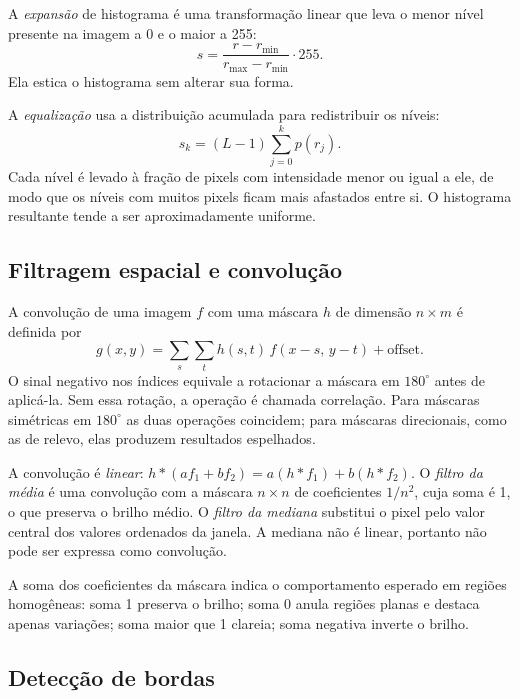 \documentclass[11pt,a4paper]{article}
\begin{document}
A \emph{expansão} de histograma é uma transformação linear que leva o menor nível presente na imagem a 0 e o maior a 255:
\begin{equation}
s = \frac{r - r_{\min}}{r_{\max} - r_{\min}}\cdot 255.
\end{equation}
Ela estica o histograma sem alterar sua forma.

A \emph{equalização} usa a distribuição acumulada para redistribuir os níveis:
\begin{equation}
s_k = (L-1)\sum_{j=0}^{k} p(r_j).
\end{equation}
Cada nível é levado à fração de pixels com intensidade menor ou igual a ele, de modo que os níveis com muitos pixels ficam mais afastados entre si. O histograma resultante tende a ser aproximadamente uniforme.

\subsection{Filtragem espacial e convolução}

A convolução de uma imagem $f$ com uma máscara $h$ de dimensão $n\times m$ é definida por
\begin{equation}
g(x,y) = \sum_{s}\sum_{t} h(s,t)\, f(x-s,\,y-t) + \text{offset}.
\end{equation}
O sinal negativo nos índices equivale a rotacionar a máscara em $180^\circ$ antes de aplicá-la. Sem essa rotação, a operação é chamada correlação. Para máscaras simétricas em $180^\circ$ as duas operações coincidem; para máscaras direcionais, como as de relevo, elas produzem resultados espelhados.

A convolução é \emph{linear}: $h*(af_1+bf_2) = a(h*f_1)+b(h*f_2)$. O \emph{filtro da média} é uma convolução com a máscara $n\times n$ de coeficientes $1/n^2$, cuja soma é 1, o que preserva o brilho médio. O \emph{filtro da mediana} substitui o pixel pelo valor central dos valores ordenados da janela. A mediana não é linear, portanto não pode ser expressa como convolução.

A soma dos coeficientes da máscara indica o comportamento esperado em regiões homogêneas: soma 1 preserva o brilho; soma 0 anula regiões planas e destaca apenas variações; soma maior que 1 clareia; soma negativa inverte o brilho.

\subsection{Detecção de bordas}
\end{document}
